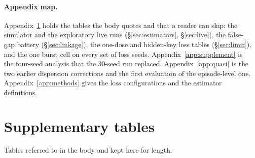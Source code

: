 \documentclass[11pt]{article}
\begin{document}



\appendix

\paragraph{Appendix map.} Appendix~\ref{app:tables} holds the tables the body
quotes and that a reader can skip: the simulator and the exploratory live runs
(\S\ref{sec:estimators}, \S\ref{sec:live}), the false-gap battery
(\S\ref{sec:linkage}), the one-dose and hidden-key loss tables
(\S\ref{sec:limit}), and the one burst cell on every set of loss seeds.
Appendix~\ref{app:supplement} is the four-seed analysis that the 30-seed run
replaced. Appendix~\ref{app:quasi} is the two earlier dispersion corrections and
the first evaluation of the episode-level one. Appendix~\ref{app:methods} gives
the loss configurations and the estimator definitions.

\section{Supplementary tables}
\label{app:tables}

Tables referred to in the body and kept here for length.

\begin{table}[h]
\centering
\small

\caption{Simulator coverage. Heterogeneity breaks the log-linear models and not
the latent classes; siloed witnesses break the latent classes and the gate
catches it; an agent that evades every witness breaks every point estimate.}
\label{tab:sim}
\end{table}

\begin{table}[h]
\centering

\caption{Exploratory live run, under both linkages. As the actions hidden from
every witness grow, the union stops covering and the estimator mostly holds.}
\label{tab:live}
\end{table}

\begin{table}[h]
\centering

\caption{False gaps across drop rates, env views and pools.}
\label{tab:falsegap}
\end{table}

\begin{table}[h]
\centering
\small

\caption{Simulator rows quoted in the text and not in Table~\ref{tab:sim}.}
\label{tab:simextra}
\end{table}
\end{document}
